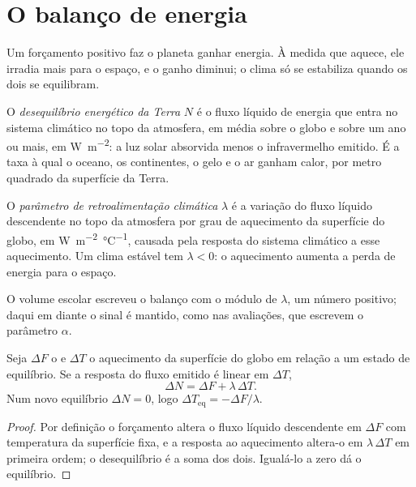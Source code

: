 \section{O balanço de energia}\label{sec:b2:anthropogenic-climate-change:energy}

Um forçamento positivo faz o planeta ganhar energia. À medida que aquece, ele irradia mais para o espaço, e o
ganho diminui; o clima só se estabiliza quando os dois se equilibram.

\begin{definition}\label{def:b2:anthropogenic-climate-change:eei}
O \emph{desequilíbrio energético da Terra} $N$ é o fluxo líquido de energia que entra
no sistema climático no topo da atmosfera, em média sobre o globo e sobre um ano ou mais,
em \unit{W.m^{-2}}: a luz solar absorvida menos o infravermelho emitido. É a taxa à qual o oceano,
os continentes, o gelo e o ar ganham calor, por metro quadrado da superfície da Terra.
\end{definition}

\begin{definition}\label{def:b2:anthropogenic-climate-change:lambda}
O \emph{parâmetro de retroalimentação climática} $\lambda$ é a variação do
fluxo líquido descendente no topo da atmosfera por grau de aquecimento da superfície do globo, em
\unit{W.m^{-2}.\celsius^{-1}}, causada pela resposta do sistema climático a esse aquecimento. Um
clima estável tem $\lambda < 0$: o aquecimento aumenta a perda de energia para o espaço.
\end{definition}

O volume escolar escreveu o balanço com o módulo de $\lambda$, um número positivo; daqui em diante o
sinal é mantido, como nas avaliações, que escrevem o parâmetro $\alpha$.

\begin{proposition}\label{prop:b2:anthropogenic-climate-change:balance}
Seja $\Delta F$ o  e $\Delta T$ o aquecimento da superfície do globo
em relação a um estado de equilíbrio. Se a resposta do fluxo emitido é linear em $\Delta T$,
\[
  \Delta N = \Delta F + \lambda\,\Delta T .
\]
Num novo equilíbrio $\Delta N = 0$, logo $\Delta T_{\text{eq}} = -\Delta F/\lambda$.
\end{proposition}
\begin{proof}
Por definição o forçamento altera o fluxo líquido descendente em $\Delta F$ com temperatura da superfície
fixa, e a resposta ao aquecimento altera-o em $\lambda\,\Delta T$ em primeira ordem;
o desequilíbrio é a soma dos dois. Igualá-lo a zero dá o equilíbrio.
\end{proof}

